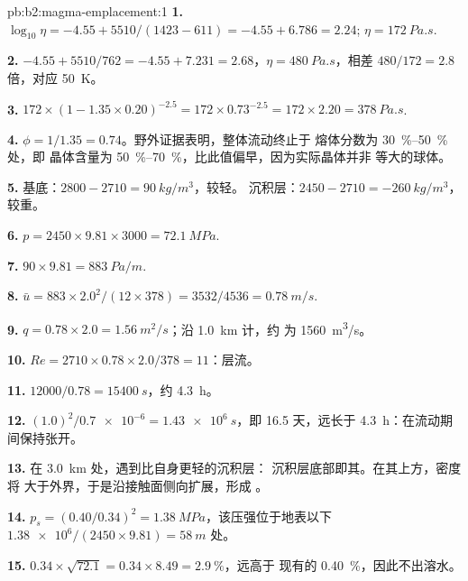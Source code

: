 \begin{solution}{pb:b2:magma-emplacement:1}
\textbf{1.} $\log_{10}\eta = -4.55 + 5510/(1423 - 611) = -4.55 + 6.786 = 2.24$;
$\eta = \qty{172}{Pa.s}$.

\textbf{2.} $-4.55 + 5510/762 = -4.55 + 7.231 = 2.68$，$\eta = \qty{480}{Pa.s}$，相差
$480/172 = 2.8$ 倍，对应 \qty{50}{K}。

\textbf{3.} $172\times(1 - 1.35\times0.20)^{-2.5} = 172\times0.73^{-2.5} = 172\times2.20 =
\qty{378}{Pa.s}$.

\textbf{4.} $\phi = 1/1.35 = 0.74$。野外证据表明，整体流动终止于
熔体分数为 \qtyrange{30}{50}{\percent} 处，即
晶体含量为 \qtyrange{50}{70}{\percent}，比此值偏早，因为实际晶体并非
等大的球体。

\textbf{5.} 基底：$2800 - 2710 = \qty{90}{kg/m^3}$，较轻。
沉积层：$2450 - 2710 = \qty{-260}{kg/m^3}$，较重。

\textbf{6.} $p = 2450\times9.81\times3000 = \qty{72.1}{MPa}$.

\textbf{7.} $90\times9.81 = \qty{883}{Pa/m}$.

\textbf{8.} $\bar u = 883\times2.0^2/(12\times378) = 3532/4536 = \qty{0.78}{m/s}$.

\textbf{9.} $q = 0.78\times2.0 = \qty{1.56}{m^2/s}$；沿 \qty{1.0}{km} 计，约
为 \qty{1560}{m^3/s}。

\textbf{10.} $Re = 2710\times0.78\times2.0/378 = 11$：层流。

\textbf{11.} $12000/0.78 = \qty{15400}{s}$，约 \qty{4.3}{h}。

\textbf{12.} $(1.0)^2/\num{0.7e-6} = \qty{1.43e6}{s}$，即 16.5 天，远长于
\qty{4.3}{h}：在流动期间保持张开。

\textbf{13.} 在 \qty{3.0}{km} 处，遇到比自身更轻的沉积层：
沉积层底部即其。在其上方，密度将
大于外界，于是沿接触面侧向扩展，形成
。

\textbf{14.} $p_s = (0.40/0.34)^2 = \qty{1.38}{MPa}$，该压强位于地表以下
$\num{1.38e6}/(2450\times9.81) = \qty{58}{m}$ 处。

\textbf{15.} $0.34\times\sqrt{72.1} = 0.34\times8.49 = \qty{2.9}{\percent}$，远高于
现有的 \qty{0.40}{\percent}，因此不出溶水。


\end{solution}
